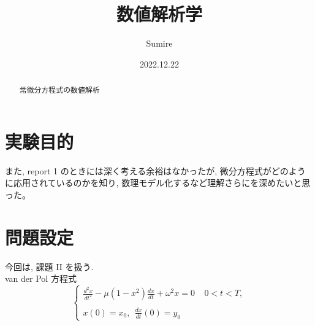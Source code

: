 \documentclass[11pt]{jsarticle}
\begin{document}
\title{数値解析学}
\author{Sumire}
\date{2022.12.22}
\maketitle

\begin{abstract}
\centerline{常微分方程式の数値解析}
\end{abstract}

\clearpage
\tableofcontents

\clearpage
\listoftables
\listoffigures

\clearpage
\section{実験目的}
また, report 1 のときには深く考える余裕はなかったが, 微分方程式がどのように応用されているのかを知り, 数理モデル化するなど理解さらにを深めたいと思った。



\section{問題設定}
今回は, 課題 II を扱う. \\
van der Pol 方程式
\[
\left\{
\begin{array}{l}
\displaystyle \frac{d^{2}x}{dt^{2}} - \mu (1 - x^{2})\frac{dx}{dt} + \omega^{2}x = 0 \ \ \ \ \ 0 < t < T, \\
\ \\
\displaystyle x(0) = x_{0} ,\ \ \frac{dx}{dt}(0) = y_{0}
\end{array}
\right.
\]
\end{document}
